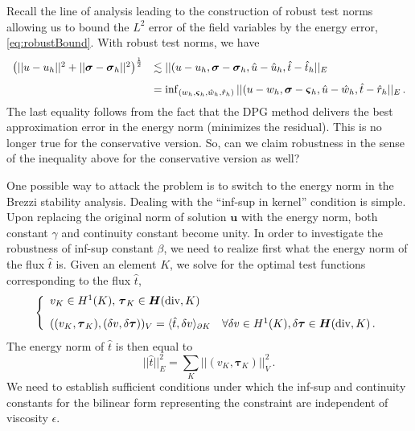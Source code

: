 \documentclass[letterpaper]{article}
\def\bftau{\boldsymbol\tau}
\def\bfvarsigma{\boldsymbol\varsigma}
\newcommand{\LRp}[1]{\left( #1 \right)}
\newcommand{\ptl}{{\partial}}
\newcommand{\bfsig}{\mbox{\boldmath $\sigma$}}
\newcommand{\bfu}{\boldsymbol u}
\newcommand{\bfH}{\mbox{\boldmath $H$}}
\begin{document}
Recall the line of analysis leading to the construction of robust
test norms allowing us to bound the $L^2$ error of the field variables by the
energy error, \eqref{eq:robustBound}. With robust test norms, we have
\begin{equation}
\begin{array}{ll}
   \LRp{|| u - u_h ||^2+ || \bfsig - \bfsig_h ||^2}^{\frac{1}{2}}
& \lesssim || (u - u_h, \bfsig - \bfsig_h, \hat{u} - \hat{u}_h, \hat{t} - \hat{t}_h ||_E \\[8pt]
&= \inf_{(w_h,\bfvarsigma_h,\hat{w}_h,\hat{r}_h)}
|| (u - w_h, \bfsig - \bfvarsigma_h, \hat{u} - \hat{w}_h, \hat{t} - \hat{r}_h ||_E\,.
\end{array}
\end{equation}
The last equality follows from the fact that the DPG method delivers the best approximation
error in the energy norm (minimizes the residual). This is no longer true for the
conservative version. So, can we claim robustness in the sense of the inequality above
for the conservative version as well?

One possible way to attack the problem is to switch to the energy norm in the Brezzi stability
analysis. Dealing with the ``inf-sup in kernel'' condition is simple. Upon replacing
the original norm of solution $\bfu$ with the energy norm, both constant $\gamma$ and continuity
constant become unity. In order to investigate the robustness of inf-sup  constant $\beta$,
we need to realize first what the energy norm of the flux $\hat{t}$ is. Given an element $K$,
we solve for the optimal test functions corresponding to the flux $\hat{t}$,
\begin{equation}
\left\{
\begin{array}{ll}
v_K \in H^1(K),\, \bftau_K \in \bfH(\text{div},K)\\[8pt]
((v_K,\bftau_K), (\delta v,\delta \bftau))_V = \langle \hat{t},\delta v\rangle_{\ptl K}
\quad \forall \delta v \in H^1(K), \delta \bftau \in \bfH(\text{div},K)\,.
\end{array}
\right.
\label{eq:local_problem}
\end{equation}
The energy norm of $\hat{t}$ is then equal to
\begin{equation}
|| \hat{t} ||_E^2 = \sum_K || (v_K,\bftau_K) ||_V^2\,.
\end{equation}
We need to establish sufficient conditions under which the inf-sup and continuity constants for
the bilinear form representing the constraint are independent of viscosity $\epsilon$.
\end{document}
